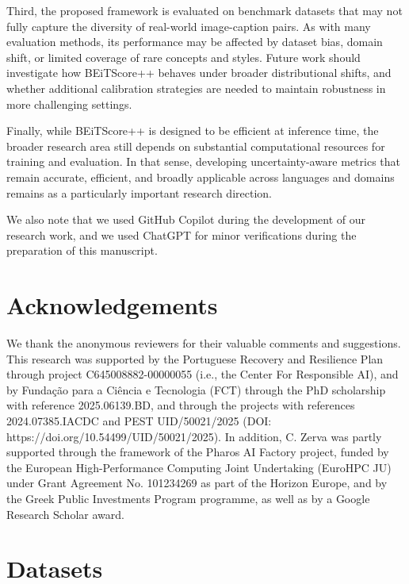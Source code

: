 \documentclass[11pt]{article}
\begin{document}
Third, the proposed framework is evaluated on benchmark datasets that may not fully capture the diversity of real-world image-caption pairs. As with many evaluation methods, its performance may be affected by dataset bias, domain shift, or limited coverage of rare concepts and styles. Future work should investigate how BEiTScore++ behaves under broader distributional shifts, and whether additional calibration strategies are needed to maintain robustness in more challenging settings.

Finally, while BEiTScore++ is designed to be efficient at inference time, the broader research area still depends on substantial computational resources for training and evaluation. In that sense, developing uncertainty-aware metrics that remain accurate, efficient, and broadly applicable across languages and domains remains as a particularly important research direction.

We also note that we used GitHub Copilot during the development of our research work, and we used ChatGPT for minor verifications during the preparation of this manuscript.

\section*{Acknowledgements}
We thank the anonymous reviewers for their valuable comments and suggestions.
This research was supported by the Portuguese Recovery and Resilience Plan through project C645008882-00000055 (i.e., the Center For Responsible AI), and by Fundação para a Ciência e Tecnologia (FCT) through the PhD scholarship with reference 2025.06139.BD, and through the projects with references 2024.07385.IACDC and PEST UID/50021/2025 (DOI: https://doi.org/10.54499/UID/50021/2025). In addition, C. Zerva was partly supported through the framework of the Pharos AI Factory project, funded by the European High-Performance Computing Joint Undertaking (EuroHPC JU) under Grant Agreement No. 101234269 as part of the Horizon Europe, and by the Greek Public Investments Program programme, as well as by a Google Research Scholar award.




\appendix

\section{Datasets}
\vspace{-0.13cm}

\label{app:datasets}
\end{document}
